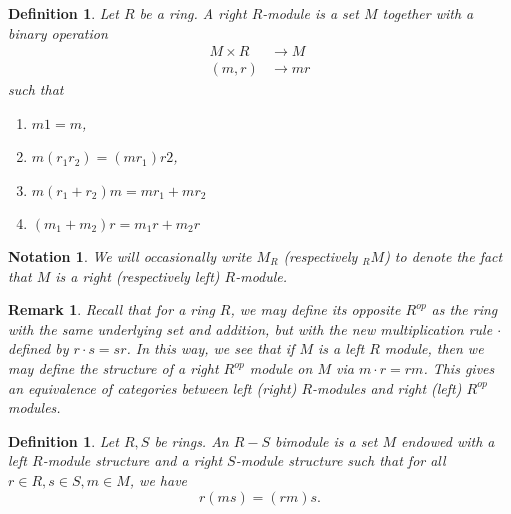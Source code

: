\documentclass[12pt]{report}
\theoremstyle{plain}
\newtheorem{defn}[thm]{Definition}
\newtheorem{notn}[thm]{Notation}
\newtheorem{rem}[thm]{Remark}
\newcommand{\X}[1]{#1\index{#1}}
\begin{document}
\begin{defn}
Let $R$ be a ring. A right $R$-module is a set $M$ together with a binary
operation
\begin{align*}
M \times R &\to M \\
(m, r) &\to mr
\end{align*}
such that
\begin{enumerate}[1. ]
\item $m 1 = m$, 
\item $m (r_1 r_2) = (m r_1) r2$, 
\item $m (r_1 + r_2)m = m r_1 + m r_2$
\item $(m_1 + m_2)r = m_1 r + m_2 r$
\end{enumerate}
\end{defn}

\begin{notn}
We will occasionally write $M_R$ (respectively $_R M$) to denote the fact
that $M$ is a right (respectively left) $R$-module.
\end{notn}

\begin{rem}
Recall that for a ring $R$, we may define its opposite $R^{op}$ as the ring
with the same underlying set and addition, but with the new multiplication
rule $\cdot$ defined by $r \cdot s = sr$. In this way, we see
that if $M$ is a left $R$ module, then we may define the structure of a
right $R^{op}$ module on $M$ via $m \cdot r = rm$. This gives an
equivalence of categories between left (right) $R$-modules and right (left)
$R^{op}$ modules.
\end{rem}

\begin{defn}
Let $R, S$ be rings. An $R-S$ \X{bimodule} is a set $M$ endowed with a left
$R$-module structure and a right $S$-module structure such that for all $r
\in R, s \in S, m \in M$, we have
\[ r(m s) = (r m) s.\]
\end{defn}
\fi

%
%
\printindex
\end{document}

